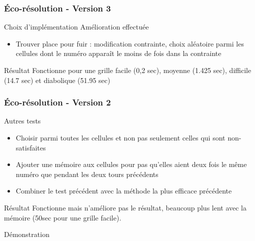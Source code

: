 \begin{frame}
    \frametitle{Éco-résolution - Version 3}
    \begin{block}{Choix d'implémentation}
    		Amélioration effectuée
    		\begin{itemize}
    			\item Trouver place pour fuir : modification contrainte, choix aléatoire parmi les cellules dont le numéro apparaît le moins de fois dans la contrainte
    		\end{itemize}
    \end{block}
    \pause
    \begin{alertblock}{Résultat}
    		Fonctionne pour une grille facile (0,2 sec), moyenne (1.425 sec), difficile (14.7 sec) et diabolique (51.95 sec)
    \end{alertblock}
\end{frame}


\begin{frame}
    \frametitle{Éco-résolution - Version 2}
    \begin{exampleblock}{Autres tests}
   		 \begin{itemize}
    				\item Choisir parmi toutes les cellules et non pas seulement celles qui sont non-satisfaites
    		 \pause
    				\item Ajouter une mémoire aux cellules pour pas qu'elles aient deux fois le même numéro que pendant les deux tours précédents 
		 \pause
				\item Combiner le test précédent avec la méthode la plus efficace précédente
		 \end{itemize}
	\end{exampleblock}
	\pause
	\begin{alertblock}{Résultat}
		Fonctionne mais n'améliore pas le résultat, beaucoup plus lent avec la mémoire (50sec pour une grille facile).
    \end{alertblock}
\end{frame}

\begin{frame}
	Démonstration
\end{frame}